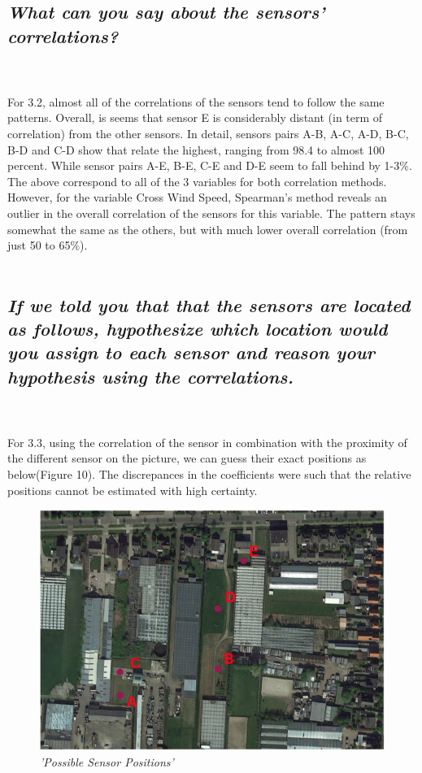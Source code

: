 \documentclass[a4paper,12pt]{article} %
\begin{document}
\subsection{\it What can you say about the sensors’ correlations?}
\\\\
For 3.2, almost all of the correlations of the 
sensors tend to follow the same patterns. Overall, is seems that sensor E 
is considerably distant (in term of correlation) from the other sensors. In 
detail, sensors pairs A-B, A-C, A-D, B-C, B-D and C-D show that relate the highest, 
ranging from 98.4 to almost 100 percent. While sensor pairs A-E, B-E, C-E and 
D-E seem to fall behind by 1-3\%. The above correspond to all of the 3 variables for both correlation methods. 
However, for the variable Cross Wind Speed, Spearman’s method reveals an outlier in the overall correlation 
of the sensors for this variable. The pattern stays somewhat the same as the others, but with much lower overall correlation (from just 50 to 65\%). 
\\\\
\subsection{\it If we told you that that the sensors are located as follows, hypothesize which location would you assign to each sensor and reason your hypothesis using the correlations.}
\\\\
For 3.3, using the correlation of the sensor in combination with the proximity of the different sensor on the picture, we can guess their exact positions as below(Figure 10). 
The discrepances in the coefficients were such that the relative positions cannot 
be estimated with high certainty.
\\
\begin{figure}[H]
\centering
\includegraphics[width=\textwidth]{Graphs/SensorsSketch.png}
\caption{\it'Possible Sensor Positions'}
\end{figure}
\\\\
\end{document}
